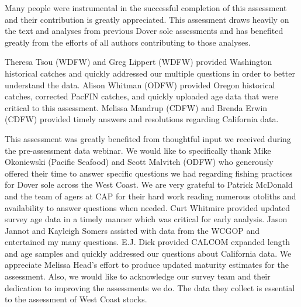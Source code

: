 \documentclass[11pt,
  english,
  a4paper,
]{article}
\begin{document}
\leavevmode\tagmcend\tagstructend


Many people were instrumental in the successful completion of this assessment and their contribution is greatly appreciated. This assessment draws heavily on the text and analyses from previous Dover sole assessments and has benefited greatly from the efforts of all authors contributing to those analyses.

\leavevmode\tagmcend\tagstructend\par


Theresa Tsou (WDFW) and Greg Lippert (WDFW) provided Washington historical catches and quickly addressed our multiple questions in order to better understand the data. Alison Whitman (ODFW) provided Oregon historical catches, corrected PacFIN catches, and quickly uploaded age data that were critical to this assessment. Melissa Mandrup (CDFW) and Brenda Erwin (CDFW) provided timely answers and resolutions regarding California data.

\leavevmode\tagmcend\tagstructend\par


This assessment was greatly benefited from thoughtful input we received during the pre-assessment data webinar. We would like to specifically thank Mike Okoniewski (Pacific Seafood) and Scott Malvitch (ODFW) who generously offered their time to answer specific questions we had regarding fishing practices for Dover sole across the West Coast. We are very grateful to Patrick McDonald and the team of agers at CAP for their hard work reading numerous otoliths and availability to answer questions when needed. Curt Whitmire provided updated survey age data in a timely manner which was critical for early analysis. Jason Jannot and Kayleigh Somers assisted with data from the WCGOP and entertained my many questions. E.J. Dick provided CALCOM expanded length and age samples and quickly addressed our questions about California data. We appreciate Melissa Head's effort to produce updated maturity estimates for the assessment. Also, we would like to acknowledge our survey team and their dedication to improving the assessments we do. The data they collect is essential to the assessment of West Coast stocks.

\leavevmode\tagmcend\tagstructend\par
\end{document}
